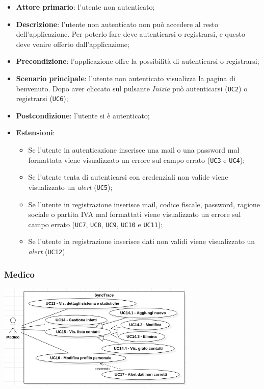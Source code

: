 \begin{itemize}
  \item \textbf{Attore primario}: l'utente non autenticato;
  \item \textbf{Descrizione}: l'utente non autenticato non può accedere al resto dell'applicazione. Per poterlo fare deve autenticarsi o registrarsi, e questo deve venire offerto dall'applicazione;
  \item \textbf{Precondizione}: l'applicazione offre la possibilità di autenticarsi o registrarsi;
  \item \textbf{Scenario principale}: l'utente non autenticato visualizza la pagina di benvenuto. Dopo aver cliccato sul pulsante \textit{Inizia} può autenticarsi (\texttt{UC2}) o registrarsi (\texttt{UC6});
  \item \textbf{Postcondizione}: l'utente si è autenticato;
  \item \textbf{Estensioni}:
    \begin{itemize}
      \item Se l'utente in autenticazione inserisce una mail o una password mal formattata viene visualizzato un errore sul campo errato (\texttt{UC3} e \texttt{UC4});
      \item Se l'utente tenta di autenticarsi con credenziali non valide viene visualizzato un \textit{alert} (\texttt{UC5});
      \item Se l'utente in registrazione inserisce mail, codice fiscale, password, ragione sociale o partita IVA mal formattati viene visualizzato un errore sul campo errato (\texttt{UC7}, \texttt{UC8}, \texttt{UC9}, \texttt{UC10} e \texttt{UC11});
      \item Se l'utente in registrazione inserisce dati non validi viene visualizzato un \textit{alert} (\texttt{UC12}).
    \end{itemize}
\end{itemize}

\subsubsection*{Medico}

\begin{minipage}{\linewidth}
  \centering
    \includegraphics[height=5cm]{immagini/uc/medico}
\end{minipage} \\

